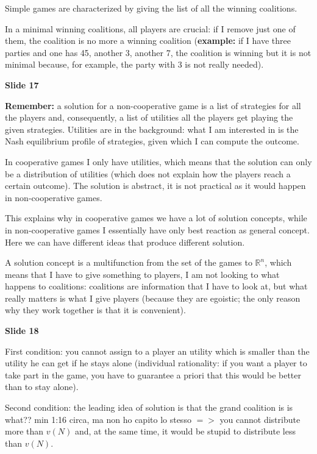 \documentclass[pt11,a4paper,twoside,reqno,openright]{paper}
\begin{document}
\noindent Simple games are characterized by giving the list of all the 
winning coalitions.

\noindent In a minimal winning coalitions, all players are crucial: if I 
remove just one of them, the coalition is no more a winning coalition 
(\textbf{example:} if I have three parties and one has 45, another 3, 
another 7, the coalition is winning but it is not minimal because, for example, 
the party with 3 is not really needed).

\bigskip
\noindent \textbf{Slide 17}

\noindent \textbf{Remember:} a solution for a non-cooperative game is a list 
of strategies for all the players and, consequently, a list of utilities 
all the players get playing the given strategies. Utilities are in the 
background: what I am interested in is the Nash equilibrium profile of 
strategies, given which I can compute the outcome.

\noindent In cooperative games I only have utilities, which means that the 
solution can only be a distribution of utilities (which does not explain 
how the players reach a certain outcome). The solution is abstract, it is 
not practical as it would happen in non-cooperative games.

\noindent This explains why in cooperative games we have a lot of solution 
concepts, while in non-cooperative games I essentially have only best reaction 
as general concept. Here we can have different ideas that produce different 
solution. 

\noindent A solution concept is a multifunction from the set of the games to 
$\mathbb{R}^n$, which means that I have to give something to players, I am 
not looking to what happens to coalitions: coalitions are information that I 
have to look at, but what really matters is what I give players (because 
they are egoistic; the only reason why they work together is that it is 
convenient).

\bigskip
\noindent \textbf{Slide 18}

\noindent First condition: you cannot assign to a player an utility which is 
smaller than the utility he can get if he stays alone (individual 
rationality: if you want a player to take part in the game, you have to 
guarantee a priori that this would be better than to stay alone).

\noindent Second condition: the leading idea of solution is that the grand 
coalition is {\huge is what?? min 1:16 circa, ma non ho capito lo stesso} 
$=>$ you cannot distribute more than $v(N)$ and, at the same time, it would be 
stupid to distribute less than $v(N)$.
\end{document}
